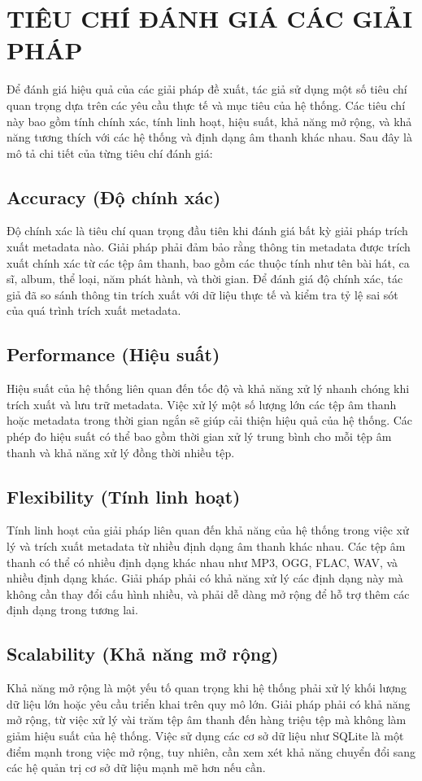 \documentclass[conference]{IEEEtran}
\begin{document}
\section{TIÊU CHÍ ĐÁNH GIÁ CÁC GIẢI PHÁP}

Để đánh giá hiệu quả của các giải pháp đề xuất, tác giả sử dụng một số tiêu chí quan trọng dựa trên các yêu cầu thực tế và mục tiêu của hệ thống. Các tiêu chí này bao gồm tính chính xác, tính linh hoạt, hiệu suất, khả năng mở rộng, và khả năng tương thích với các hệ thống và định dạng âm thanh khác nhau. Sau đây là mô tả chi tiết của từng tiêu chí đánh giá:

\subsection{Accuracy (Độ chính xác)}
Độ chính xác là tiêu chí quan trọng đầu tiên khi đánh giá bất kỳ giải pháp trích xuất metadata nào. Giải pháp phải đảm bảo rằng thông tin metadata được trích xuất chính xác từ các tệp âm thanh, bao gồm các thuộc tính như tên bài hát, ca sĩ, album, thể loại, năm phát hành, và thời gian. Để đánh giá độ chính xác, tác giả đã so sánh thông tin trích xuất với dữ liệu thực tế và kiểm tra tỷ lệ sai sót của quá trình trích xuất metadata.

\subsection{Performance (Hiệu suất)}
Hiệu suất của hệ thống liên quan đến tốc độ và khả năng xử lý nhanh chóng khi trích xuất và lưu trữ metadata. Việc xử lý một số lượng lớn các tệp âm thanh hoặc metadata trong thời gian ngắn sẽ giúp cải thiện hiệu quả của hệ thống. Các phép đo hiệu suất có thể bao gồm thời gian xử lý trung bình cho mỗi tệp âm thanh và khả năng xử lý đồng thời nhiều tệp.

\subsection{Flexibility (Tính linh hoạt)}
Tính linh hoạt của giải pháp liên quan đến khả năng của hệ thống trong việc xử lý và trích xuất metadata từ nhiều định dạng âm thanh khác nhau. Các tệp âm thanh có thể có nhiều định dạng khác nhau như MP3, OGG, FLAC, WAV, và nhiều định dạng khác. Giải pháp phải có khả năng xử lý các định dạng này mà không cần thay đổi cấu hình nhiều, và phải dễ dàng mở rộng để hỗ trợ thêm các định dạng trong tương lai.

\subsection{Scalability (Khả năng mở rộng)}
Khả năng mở rộng là một yếu tố quan trọng khi hệ thống phải xử lý khối lượng dữ liệu lớn hoặc yêu cầu triển khai trên quy mô lớn. Giải pháp phải có khả năng mở rộng, từ việc xử lý vài trăm tệp âm thanh đến hàng triệu tệp mà không làm giảm hiệu suất của hệ thống. Việc sử dụng các cơ sở dữ liệu như SQLite là một điểm mạnh trong việc mở rộng, tuy nhiên, cần xem xét khả năng chuyển đổi sang các hệ quản trị cơ sở dữ liệu mạnh mẽ hơn nếu cần.
\end{document}

